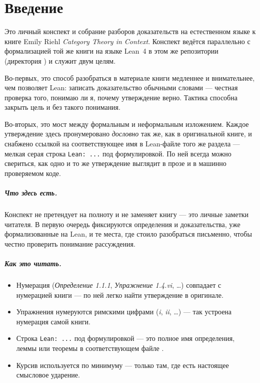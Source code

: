 \chapter*{Введение}

Это личный конспект и собрание разборов доказательств на естественном языке к книге
Emily Riehl \emph{Category Theory in Context}. Конспект ведётся параллельно с формализацией
той же книги на языке Lean~4 в этом же репозитории (директория
) и служит двум целям.

Во-первых, это способ разобраться в материале книги медленнее и внимательнее, чем позволяет
Lean: записать доказательство обычными словами — честная проверка того, понимаю ли я, почему
утверждение верно. Тактика способна закрыть цель и без такого понимания.

Во-вторых, это мост между формальным и неформальным изложением. Каждое утверждение здесь
пронумеровано \emph{дословно} так же, как в оригинальной книге, и снабжено ссылкой на
соответствующее имя в Lean-файле того же раздела — мелкая серая строка \texttt{Lean:~...} под
формулировкой. По ней всегда можно свериться, как одно и то же утверждение выглядит в прозе и
в машинно проверяемом коде.

\paragraph{Что здесь есть.}
Конспект не претендует на полноту и не заменяет книгу — это личные заметки читателя. В первую
очередь фиксируются определения и доказательства, уже формализованные на Lean, и те места, где
стоило разобраться письменно, чтобы честно проверить понимание рассуждения.

\paragraph{Как это читать.}
\begin{itemize}
  \item Нумерация (\emph{Определение 1.1.1}, \emph{Упражнение 1.4.vi}, \dots) совпадает с
        нумерацией книги — по ней легко найти утверждение в оригинале.
  \item Упражнения нумеруются римскими цифрами (\emph{i}, \emph{ii}, \dots) — так устроена
        нумерация самой книги.
  \item Строка \texttt{Lean:~...} под формулировкой — это полное имя определения, леммы или
        теоремы в соответствующем файле .
  \item Курсив используется по минимуму — только там, где есть настоящее смысловое ударение.
\end{itemize}
